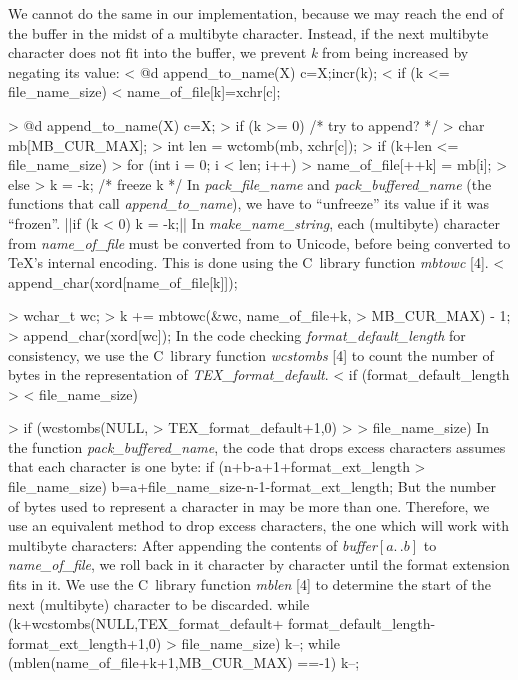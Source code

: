 We cannot do the same in our implementation, because we may reach
the end of the buffer
in the midst of
a multibyte character. Instead, if the next multibyte
character does not fit into the buffer, we prevent {\it k\/} from
being increased by negating its value:
\verbatim
< @d append_to_name(X) { c=X;incr(k);
<   if (k <= file_name_size)
<     name_of_file[k]=xchr[c]; } 

> @d append_to_name(X) { c=X;
>   if (k >= 0) { /* try to append? */
>     char mb[MB_CUR_MAX];
>     int len = wctomb(mb, xchr[c]);
>     if (k+len <= file_name_size)
>       for (int i = 0; i < len; i++)
>         name_of_file[++k] = mb[i];
>     else
>       k = -k; /* freeze k */ } }
\endverbatim
\medskip
In {\it pack\_file\_name\/} and {\it pack\_buffered\_name\/}
(the functions that call {\it append\_to\_name\/}),
we have to ``unfreeze'' its value
if it was ``frozen''.
||if (k < 0) k = -k;||
\medskip
In {\it make\_name\_string},
each (multibyte) character from {\it name\_of\_file\/}
must be converted from  to Unicode,
before being converted to \TeX's internal encoding.
This is done using the C~library function
{\it mbtowc\/} [4].
\verbatim
< append_char(xord[name_of_file[k]]);

> { wchar_t wc;
>   k += mbtowc(&wc, name_of_file+k,
>               MB_CUR_MAX) - 1;
>   append_char(xord[wc]); }
\endverbatim
\medskip
In the code checking {\it format\_default\_length\/}
for consistency, we
use the C~library function {\it wcstombs\/} [4] to count
the number of bytes in the  representation of
{\it TEX\_format\_default\/}.
\verbatim
< if (format_default_length >
<     file_name_size)

> if (wcstombs(NULL,
>     TEX_format_default+1,0) >
>     file_name_size)
\endverbatim
\medskip
In the function {\it pack\_buffered\_name\/},
the code that drops excess characters
assumes that each character is one byte:
\verbatim
if (n+b-a+1+format_ext_length >
    file_name_size)
  b=a+file_name_size-n-1-format_ext_length;
\endverbatim
But the number of bytes used to represent
a character in \hbox{} may be more than one.
Therefore, we use an equivalent method to drop excess
characters, the one which will work with multibyte characters:
After appending
the contents of
{\it buffer\/$[a\mathrel{.\,.}b]$\/}
to {\it name\_of\_file\/}, we roll back in it
character by character until the
format extension fits in it. We use the C~library
function {\it mblen\/} [4] to determine
the start of the next (multibyte) character to be discarded.
\verbatim
while (k+wcstombs(NULL,TEX_format_default+
       format_default_length-
       format_ext_length+1,0) >
       file_name_size) {
  k--;
  while (mblen(name_of_file+k+1,MB_CUR_MAX)
         ==-1)
    k--;
}
\endverbatim

